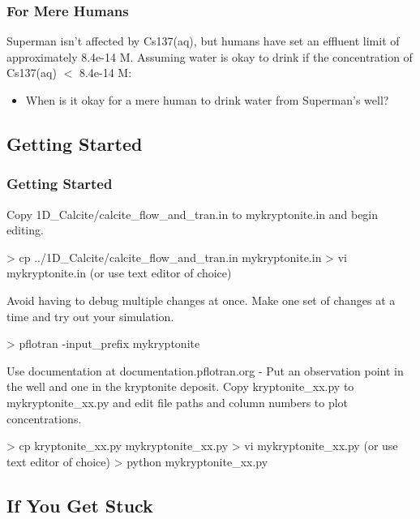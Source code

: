 \documentclass{beamer}
\newcommand\bluecomment[1]{{{\color{blue} #1}}}
\newcommand\greencomment[1]{{{\color{green} #1}}}
\begin{document}
\begin{frame}[fragile]\frametitle{For Mere Humans}
Superman isn't affected by \greencomment{Cs137(aq)}, but humans have set an effluent limit of approximately 8.4e-14 M. Assuming water is okay to drink if the concentration of \greencomment{Cs137(aq)} $<$ 8.4e-14 M:

\begin{itemize}
  \item When is it okay for a mere human to drink water from Superman's well?
\end{itemize}

\end{frame}

\subsection{Getting Started}

\begin{frame}[fragile]\frametitle{Getting Started}
Copy 1D\_Calcite/calcite\_flow\_and\_tran.in to mykryptonite.in and begin editing.
\begin{semiverbatim}
  > cp ../1D\_Calcite/calcite\_flow\_and\_tran.in mykryptonite.in
  > vi mykryptonite.in \bluecomment{(or use text editor of choice)}
\end{semiverbatim}
Avoid having to debug multiple changes at once. Make one set of changes at a time and try out your simulation.
\begin{semiverbatim}
  > pflotran -input\_prefix mykryptonite
\end{semiverbatim}
Use documentation at \bluecomment{documentation.pflotran.org}
-
Put an observation point in the well and one in the kryptonite deposit. Copy kryptonite\_xx.py to mykryptonite\_xx.py and edit file paths and column numbers to plot concentrations.
\begin{semiverbatim}
  > cp kryptonite\_xx.py mykryptonite\_xx.py
  > vi mykryptonite\_xx.py \bluecomment{(or use text editor of choice)}
  > python mykryptonite\_xx.py
\end{semiverbatim}

\end{frame}

\subsection{If You Get Stuck}
\end{document}
